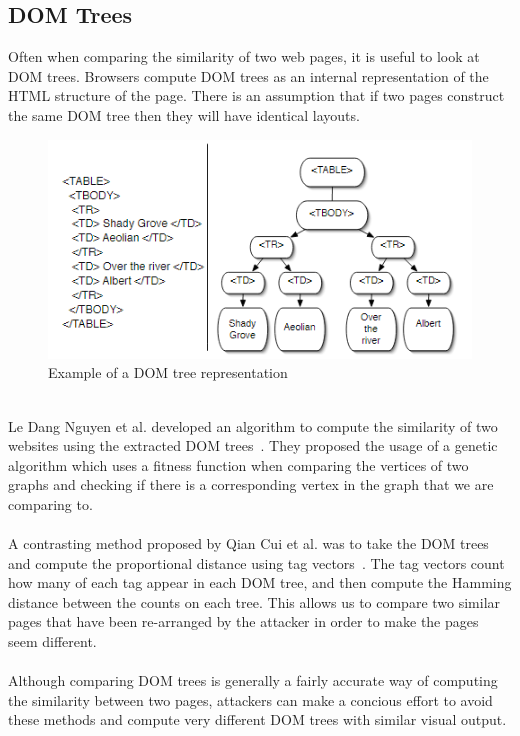 \documentclass[12pt,twoside]{report}
\begin{document}
\subsection{DOM Trees}
Often when comparing the similarity of two web pages, it is useful to look at DOM trees. Browsers compute DOM trees as an internal representation of the HTML structure of the page. There is an assumption that if two pages construct the same DOM tree then they will have identical layouts.
\begin{figure}[h]
  \begin{center}
    \includegraphics[]{images/domtree.png}
  \end{center}
  \caption{Example of a DOM tree representation~\cite{layoutsimilarity}}
  \label{fig:domtree}
\end{figure}
\\
Le Dang Nguyen et al. developed an algorithm to compute the similarity of two websites using the extracted DOM trees~\cite{domtreestructure}. They proposed the usage of a genetic algorithm which uses a fitness function when comparing the vertices of two graphs and checking if there is a corresponding vertex in the graph that we are comparing to.
\\\\
A contrasting method proposed by Qian Cui et al. was to take the DOM trees and compute the proportional distance using tag vectors~\cite{phishingovertime}. The tag vectors count how many of each tag appear in each DOM tree, and then compute the Hamming distance between the counts on each tree. This allows us to compare two similar pages that have been re-arranged by the attacker in order to make the pages seem different.
\\\\
Although comparing DOM trees is generally a fairly accurate way of computing the similarity between two pages, attackers can make a concious effort to avoid these methods and compute very different DOM trees with similar visual output.
\end{document}
